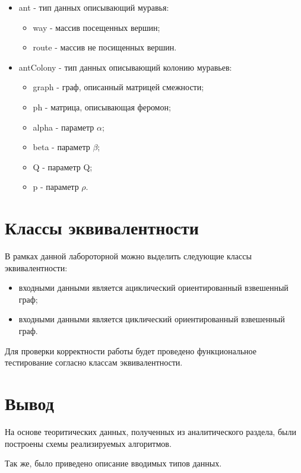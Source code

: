 \documentclass[12pt,a4paper]{report}
\begin{document}
\begin{itemize}
	\item ant - тип данных описывающий муравья:
		\begin{itemize}
			\item way - массив посещенных вершин;
			\item route - массив не посищенных вершин.
		\end{itemize}
	\item antColony - тип данных описывающий колонию муравьев:
		\begin{itemize}
			\item graph - граф, описанный матрицей смежности;
			\item ph - матрица, описывающая феромон;
			\item alpha - параметр $ {\alpha }$;
			\item beta - параметр $ {\beta }$;
			\item Q - параметр Q;
			\item p - параметр $ {\rho }$.
		\end{itemize}
\end{itemize}


\section{Классы эквивалентности}

В рамках данной лабороторной можно выделить следующие классы эквивалентности:

\begin{itemize}
	\item входными данными является ациклический ориентированный взвешенный граф;
	\item входными данными является циклический ориентированный взвешенный граф.
\end{itemize}	

Для проверки корректности работы будет проведено функциональное тестирование согласно классам эквивалентности.

\section*{Вывод}

На основе теоритических данных, полученных из аналитического раздела, были построены схемы реализируемых алгоритмов.

Так же, было приведено описание вводимых типов данных.
\end{document}
